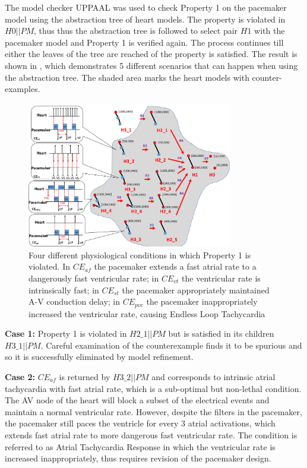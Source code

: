 The model checker UPPAAL\cite{uppaal} was used to check Property 1 on the pacemaker model using the abstraction tree of heart models.
The property is violated in $H0 || PM$, thus thus the abstraction tree is followed to select pair $H1$ with the pacemaker model and Property 1 is verified again.
The process continues till either the leaves of the tree are reached of the property is satisfied.
The result is shown in , which demonstrates 5 different scenarios that can happen when using the abstraction tree.
The shaded area marks the heart models with counter-examples.
\begin{figure}[!t]
	\centering
	\includegraphics[width=0.8\textwidth]{figs/tree.pdf}
	\caption{\small Four different physiological conditions in which Property 1 is violated. In $CE_{af}$ the pacemaker extends a fast atrial rate to a dangerously fast ventricular rate; in $CE_{vt}$ the ventricular rate is intrinsically fast; in $CE_{st}$ the pacemaker appropriately maintained A-V conduction delay; in $CE_{pvc}$ the pacemaker inappropriately increased the ventricular rate, causing Endless Loop Tachycardia}
	\label{fig:CE}
\end{figure}
\textbf{Case 1:} Property 1 is violated in $H2\_1 || PM$ but is satisfied in its children $H3\_1 || PM$.
Careful examination of the counterexample finds it to be spurious and so it is successfully eliminated by model refinement.

\textbf{Case 2:} $CE_{af}$ is returned by $H3\_2 || PM$ and corresponds to intrinsic atrial tachycardia with fast atrial rate, which is a sub-optimal but non-lethal condition.
The AV node of the heart will block a subset of the electrical events and maintain a normal ventricular rate.
However, despite the filters in the pacemaker, the pacemaker still paces the ventricle for every 3 atrial activations, which extends fast atrial rate to more dangerous fast ventricular rate. 
The condition is referred to as Atrial Tachycardia Response in which the ventricular rate is increased inappropriately, thus requires revision of the pacemaker design.

